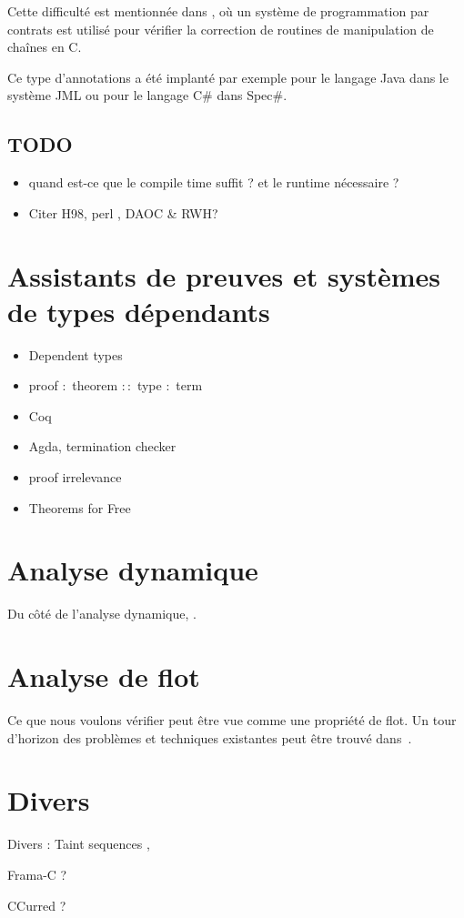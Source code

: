 Cette difficulté est mentionnée dans \cite{cssv}, où un système de programmation
par contrats est utilisé pour vérifier la correction de routines de manipulation
de chaînes en C.

Ce type d'annotations a été implanté par exemple pour le langage Java dans le
système JML\cite{jmlkluwer} ou pour le langage C\# dans Spec\#\cite{krml136}.


\subsection*{TODO}

\begin{itemize}
\item
  quand est-ce que le compile time suffit ? et le runtime nécessaire ?
\item
  Citer H98\cite{haskell98}, perl \cite{perlCamelBook}, DAOC\cite{DAOC} \&
  RWH\cite{rwh}?
\end{itemize}

\section{Assistants de preuves et systèmes de types dépendants}

\begin{itemize}
\item Dependent types
\item proof $:$ theorem $::$ type $:$ term
\item Coq
\item Agda, termination checker
\item proof irrelevance
\item Theorems for Free\cite{theoremsforfree}
\end{itemize}


\section{Analyse dynamique}

Du côté de l'analyse dynamique, \cite{oakland10}.

\section{Analyse de flot}

Ce que nous voulons vérifier peut être vue comme une propriété de flot. Un tour
d'horizon des problèmes et techniques existantes peut être trouvé
dans~\cite{sm-jsac03}.

\section{Divers}

Divers : Taint sequences \cite{mdv10},

Frama-C ?

CCurred ?
